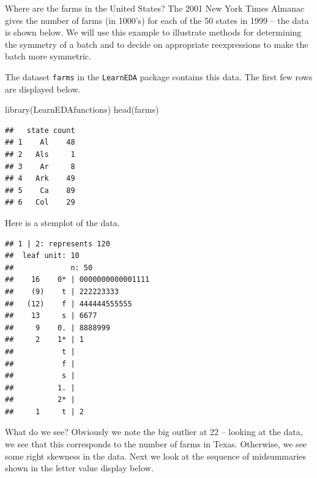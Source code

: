 \documentclass[
]{book}
\newenvironment{Shaded}{\begin{snugshade}}{\end{snugshade}}
\newcommand{\AttributeTok}[1]{\textcolor[rgb]{0.77,0.63,0.00}{#1}}
\newcommand{\ConstantTok}[1]{\textcolor[rgb]{0.00,0.00,0.00}{#1}}
\newcommand{\DecValTok}[1]{\textcolor[rgb]{0.00,0.00,0.81}{#1}}
\newcommand{\FunctionTok}[1]{\textcolor[rgb]{0.00,0.00,0.00}{#1}}
\newcommand{\NormalTok}[1]{#1}
\newcommand{\SpecialCharTok}[1]{\textcolor[rgb]{0.00,0.00,0.00}{#1}}
\begin{document}
Where are the farms in the United States? The 2001 New York Times Almanac gives the number of farms (in 1000's) for each of the 50 states in 1999 -- the data is shown below. We will use this example to illustrate methods for determining the symmetry of a batch and to decide on appropriate reexpressions to make the batch more symmetric.

The dataset \texttt{farms} in the \texttt{LearnEDA} package contains this data. The first few rows are displayed below.

\begin{Shaded}
\begin{Highlighting}[]
\FunctionTok{library}\NormalTok{(LearnEDAfunctions)}
\FunctionTok{head}\NormalTok{(farms)}
\end{Highlighting}
\end{Shaded}

\begin{verbatim}
##   state count
## 1    Al    48
## 2   Als     1
## 3    Ar     8
## 4   Ark    49
## 5    Ca    89
## 6   Col    29
\end{verbatim}

Here is a stemplot of the data.

\begin{Shaded}
\end{Shaded}

\begin{verbatim}
## 1 | 2: represents 120
##  leaf unit: 10
##             n: 50
##    16    0* | 0000000000001111
##    (9)    t | 222223333
##   (12)    f | 444444555555
##    13     s | 6677
##     9    0. | 8888999
##     2    1* | 1
##           t | 
##           f | 
##           s | 
##          1. | 
##          2* | 
##     1     t | 2
\end{verbatim}

What do we see? Obviously we note the big outlier at 22 -- looking at the data, we see that this corresponds to the number of farms in Texas. Otherwise, we see some right skewness in the data. Next we look at the sequence of midsummaries shown in the letter value display below.
\end{document}

